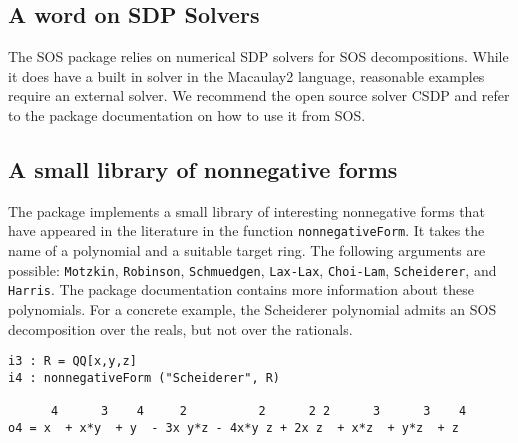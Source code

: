 \documentclass[11pt]{amsart}
\theoremstyle{plain}%
\theoremstyle{definition}
\theoremstyle{remark}
\newcommand{\Mac}{Macaulay2\xspace}
\newcommand{\SOS}{\textsc{SOS}\xspace}
\begin{document}

\subsection*{A word on SDP Solvers}
The \SOS package relies on numerical SDP solvers for SOS
decompositions.  While it does have a built in solver in the \Mac
language, reasonable examples require an external solver.  We
recommend the open source solver CSDP \cite{borchers1999csdp} and
refer to the package documentation on how to use it from \SOS.

\subsection*{A small library of nonnegative forms}
The package implements a small library of interesting nonnegative forms that have appeared in the literature in the function  \verb|nonnegativeForm|.
It takes the name of a polynomial and a suitable target ring.
The following arguments are possible: \verb|Motzkin|, \verb|Robinson|, \verb|Schmuedgen|, \verb|Lax-Lax|, \verb|Choi-Lam|, \verb|Scheiderer|, and \verb|Harris|.
The package documentation contains more information about these polynomials.
For a concrete example, the Scheiderer polynomial admits an SOS decomposition over the reals, but not over the rationals.
{\small
\begin{verbatim}
i3 : R = QQ[x,y,z]
i4 : nonnegativeForm ("Scheiderer", R)

      4      3    4     2          2      2 2      3      3    4
o4 = x  + x*y  + y  - 3x y*z - 4x*y z + 2x z  + x*z  + y*z  + z

\end{verbatim}
}
\end{document}
